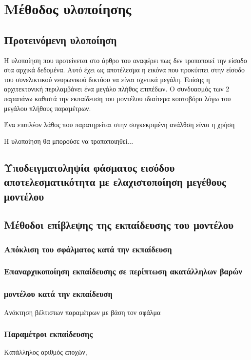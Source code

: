 \chapter{Μέθοδος υλοποίησης}
\label{ch:implementation_method}

\section{Προτεινόμενη υλοποίηση}
Η υλοποίηση που προτείνεται στο άρθρο του \cite{padarian_lucas_soil} αναφέρει πως δεν τροποποιεί την είσοδο στα αρχικά δεδομένα. Αυτό έχει ως αποτέλεσμα η εικόνα που προκύπτει στην είσοδο του συνελικτικού νευρωνικού δικτύου να είναι σχετικά μεγάλη. Επίσης η αρχιτεκτονική περιλαμβάνει ένα μεγάλο πλήθος επιπέδων. Ο συνδυασμός των 2 παραπάνω καθιστά την εκπαίδευση του μοντέλου ιδιαίτερα κοστοβόρα λόγω του μεγάλου πλήθους παραμέτρων.

Ένα επιπλέον λάθος που παρατηρείται στην συγκεκριμένη ανάλθση είναι η χρήση 

Η υλοποίηση θα μπορούσε να τροποποιηθεί...

\section{Υποδειγματοληψία φάσματος εισόδου --- αποτελεσματικότητα με ελαχιστοποίηση μεγέθους μοντέλου}

\section{Μέθοδοι επίβλεψης της εκπαίδευσης του μοντέλου}

\subsection{Απόκλιση του σφάλματος  κατά την εκπαίδευση}

\subsection{Επαναρχικοποίηση εκπαίδευσης σε περίπτωση ακατάλληλων βαρών}

\subsection{ μοντέλου κατά την εκπαίδευση}
Ανάκτηση βέλτιστων παραμέτρων με βάση τον σφάλμα 

\subsection{Παραμέτροι εκπαίδευσης}
Κατάλληλος αριθμός εποχών, 

